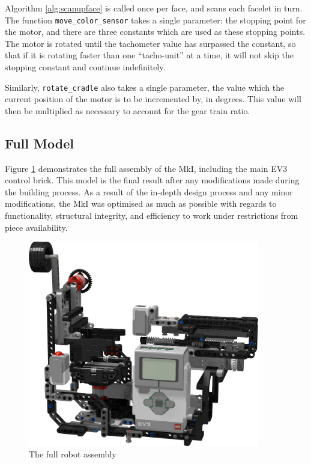 \documentclass{report}
\begin{document}
	Algorithm \ref{alg:scanupface} is called once per face, and scans each facelet in turn. The function \lstinline|move_color_sensor| takes a single parameter: the stopping point for the motor, and there are three constants which are used as these stopping points. The motor is rotated until the tachometer value has surpassed the constant, so that if it is rotating faster than one \enquote{tacho-unit} at a time, it will not skip the stopping constant and continue indefinitely.
	
	Similarly, \lstinline|rotate_cradle| also takes a single parameter, the value which the current position of the motor is to be incremented by, in degrees. This value will then be multiplied as necessary to account for the gear train ratio.

	\subsection{Full Model}
	
	Figure \ref{fig:rdrFullRobotV1} demonstrates the full assembly of the MkI, including the main EV3 control brick. This model is the final result after any modifications made during the building process. As a result of the in-depth design process and any minor modifications, the MkI was optimised as much as possible with regards to functionality, structural integrity, and efficiency to work under restrictions from piece availability.
	
	\begin{figure}[h]
		\centering
		\includegraphics[width=0.9\textwidth]{Resources/Images/rdrFullRobotV1.png}
		\caption{The full robot assembly}
		\label{fig:rdrFullRobotV1}
	\end{figure}
	
\end{document}
